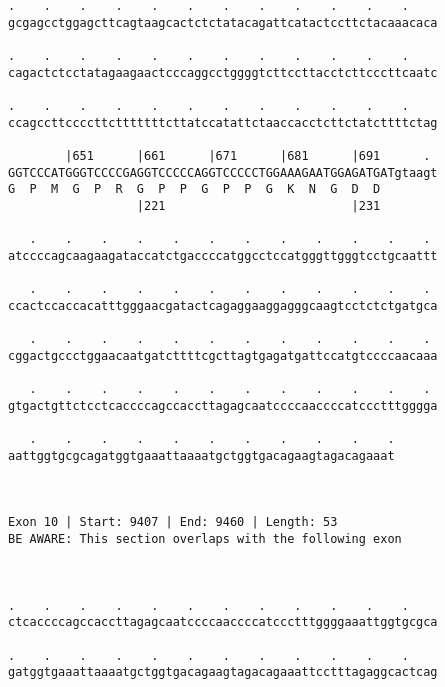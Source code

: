 \documentclass{article}
\begin{document}
\begin{Verbatim}
.    .    .    .    .    .    .    .    .    .    .    .    
gcgagcctggagcttcagtaagcactctctatacagattcatactccttctacaaacaca
                                                            
.    .    .    .    .    .    .    .    .    .    .    .    
cagactctcctatagaagaactcccaggcctggggtcttccttacctcttcccttcaatc
                                                            
.    .    .    .    .    .    .    .    .    .    .    .    
ccagccttccccttctttttttcttatccatattctaaccacctcttctatcttttctag
                                                            
        |651      |661      |671      |681      |691      . 
GGTCCCATGGGTCCCCGAGGTCCCCCAGGTCCCCCTGGAAAGAATGGAGATGATgtaagt
G  P  M  G  P  R  G  P  P  G  P  P  G  K  N  G  D  D        
                  |221                          |231        
  
   .    .    .    .    .    .    .    .    .    .    .    . 
atccccagcaagaagataccatctgaccccatggcctccatgggttgggtcctgcaattt
                                                            
   .    .    .    .    .    .    .    .    .    .    .    . 
ccactccaccacatttgggaacgatactcagaggaaggagggcaagtcctctctgatgca
                                                            
   .    .    .    .    .    .    .    .    .    .    .    . 
cggactgccctggaacaatgatcttttcgcttagtgagatgattccatgtccccaacaaa
                                                            
   .    .    .    .    .    .    .    .    .    .    .    . 
gtgactgttctcctcaccccagccaccttagagcaatccccaaccccatccctttgggga
                                                            
   .    .    .    .    .    .    .    .    .    .    .
aattggtgcgcagatggtgaaattaaaatgctggtgacagaagtagacagaaat
                                                      
                                                      
 
Exon 10 | Start: 9407 | End: 9460 | Length: 53
BE AWARE: This section overlaps with the following exon



.    .    .    .    .    .    .    .    .    .    .    .    
ctcaccccagccaccttagagcaatccccaaccccatccctttggggaaattggtgcgca
                                                            
.    .    .    .    .    .    .    .    .    .    .    .    
gatggtgaaattaaaatgctggtgacagaagtagacagaaattcctttagaggcactcag
                                                            

\end{Verbatim}
\end{document}
